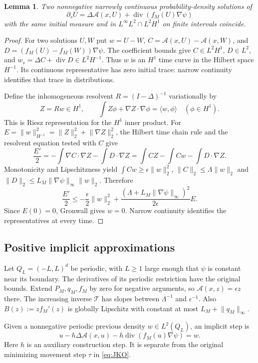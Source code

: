 \documentclass[11pt]{article}
\numberwithin{equation}{section}
\newtheorem{lemma}[theorem]{Lemma}
\theoremstyle{definition}
\theoremstyle{remark}
\newcommand{\Div}{\operatorname{div}}
\newcommand{\norm}[1]{\lVert #1\rVert}
\begin{document}
\begin{lemma}\label{lem:comparison}
Two nonnegative narrowly continuous probability-density solutions of
\[
 \partial_s U=\Delta\mathcal A(x,U)+\Div(f_M(U)\nabla\psi)
\]
with the same initial measure and in $L^\infty L^2\cap L^2H^1$ on finite
intervals coincide.
\end{lemma}

\begin{proof}
For two solutions $U,W$ put
$w=U-W$, $C=\mathcal A(x,U)-\mathcal A(x,W)$, and
$D=(f_M(U)-f_M(W))\nabla\psi$.
The coefficient bounds give $C\in L^2H^1$, $D\in L^2$, and
$w_s=\Delta C+\Div D\in L^2H^{-1}$.
Thus $w$ is an $H^1$ time curve in the Hilbert space $H^{-1}$.
Its continuous representative has zero initial trace: narrow continuity
identifies that trace in distributions.

Define the inhomogeneous resolvent $R=(I-\Delta)^{-1}$ variationally by
\[
 Z=Rw\in H^1,\qquad
 \int Z\phi+\nabla Z\cdot\nabla\phi=\langle w,\phi\rangle
 \quad(\phi\in H^1).
\]
This is Riesz representation for the $H^1$ inner product.
For $E=\norm w_{H^{-1}}^2=\norm Z_2^2+\norm{\nabla Z}_2^2$,
the Hilbert time chain rule and the resolvent equation tested with $C$ give
\[
 \frac{E'}2=-\int\nabla C\cdot\nabla Z-\int D\cdot\nabla Z
             =\int CZ-\int Cw-\int D\cdot\nabla Z.
\]
Monotonicity and Lipschitzness yield
$\int Cw\ge\epsilon\norm w_2^2$,
$\norm C_2\le\Lambda\norm w_2$ and
$\norm D_2\le L_M\norm{\nabla\psi}_\infty\norm w_2$.
Therefore
\[
 \frac{E'}2\le-\frac\epsilon2\norm w_2^2
       +\frac{(\Lambda+L_M\norm{\nabla\psi}_\infty)^2}{2\epsilon}E.
\]
Since $E(0)=0$, Gronwall gives $w=0$. Narrow continuity identifies the
representatives at every time.
\end{proof}

\subsection{Positive implicit approximations}
Let $Q_L=(-L,L)^d$ be periodic, with $L\ge1$ large enough that $\psi$ is
constant near its boundary. The derivatives of its periodic restriction
have the original bounds. Extend $P_M,q_M,f_M$ by zero for negative
arguments, so $\mathcal A(x,z)=\epsilon z$ there. The increasing inverse
$\mathcal T$ has slopes between $\Lambda^{-1}$ and $\epsilon^{-1}$.
Also $B(z):=zf_M'(z)$ is globally Lipschitz with constant at most
$L_M+\norm{q_M}_\infty$.

Given a nonnegative periodic previous density $w\in L^2(Q_L)$, an implicit step is
\begin{equation}\label{eq:implicit-step}
 u-h\Delta\mathcal A(x,u)-h\Div(f_M(u)\nabla\psi)=w.
\end{equation}
Here $h$ is an auxiliary construction step. It is separate from the
original minimizing movement step $\tau$ in \eqref{eq:JKO}.
\end{document}
